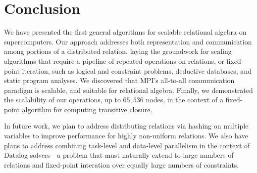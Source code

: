 \documentclass[sigconf,review, anonymous]{acmart}
\begin{document}

%



%
\maketitle











\section{Conclusion}

We have presented the first general algorithms for scalable relational algebra on supercomputers. Our approach addresses both representation and communication among portions of a distributed relation, laying the groundwork for scaling algorithms that require a pipeline of repeated operations on relations, or fixed-point iteration, such as logical and constraint problems, deductive databases, and static program analyses. We discovered that MPI's all-to-all communication paradigm is scalable, and suitable for relational algebra. Finally, we demonstrated the scalability of our operations, up to $65,\!536$ nodes, in the context of a fixed-point algorithm for computing transitive closure.

In future work, we plan to address distributing relations via hashing on multiple variables to improve performance for highly non-uniform relations. We also have plans to address combining task-level and data-level parallelism in the context of Datalog solvers---a problem that must naturally extend to large numbers of relations and fixed-point interation over equally large numbers of constraints.





%

%



% 
\end{document}
